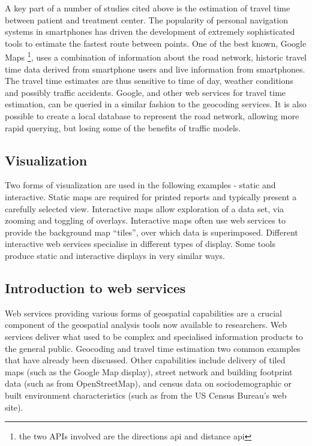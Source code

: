 \documentclass[utf8]{frontiersHLTH}
\begin{document}
A key part of a number of studies cited above is the estimation of
travel time between patient and treatment center. The popularity of
personal navigation systems in smartphones has driven the development of
extremely sophisticated tools to estimate the fastest route between
points. One of the best known, Google Maps \footnote{the two APIs
involved are the directions api and distance api}, uses a combination
of information about the road network, historic travel time data derived
from smartphone users and live information from smartphones. The travel
time estimates are thus sensitive to time of day, weather conditions and
possibly traffic accidents. Google, and other web services for travel
time estimation, can be queried in a similar fashion to the geocoding
services. It is also possible to create a local database to represent
the road network, allowing more rapid querying, but losing some of the
benefits of traffic models.

\subsection{Visualization}\label{visualization}

Two forms of visualization are used in the following examples - static
and interactive. Static maps are required for printed reports and
typically present a carefully selected view. Interactive maps allow
exploration of a data set, via zooming and toggling of overlays.
Interactive maps often use web services to provide the background map
``tiles'', over which data is superimposed. Different interactive web
services specialise in different types of display. Some tools produce
static and interactive displays in very similar ways.

\hypertarget{introduction-to-web-services}{%
\subsection{Introduction to web
services}\label{introduction-to-web-services}}

Web services providing various forms of geospatial capabilities are a
crucial component of the geospatial analysis tools now available to
researchers. Web services deliver what used to be complex and
specialised information products to the general public. Geocoding and
travel time estimation two common examples that have already been
discussed. Other capabilities include delivery of tiled maps (such as
the Google Map display), street network and building footprint data
(such as from OpenStreetMap), and census data on sociodemographic or
built environment characteristics (such as from the US Census Bureau's
web site).
\end{document}

